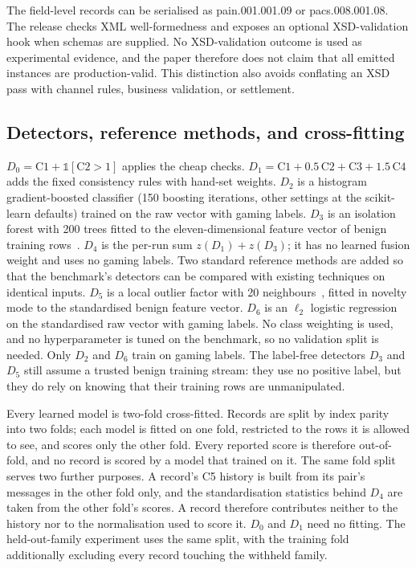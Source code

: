 \documentclass[conference]{IEEEtran}
\begin{document}
The field-level records can be serialised as pain.001.001.09 or
pacs.008.001.08. The release checks XML well-formedness and exposes an optional
XSD-validation hook when schemas are supplied. No XSD-validation outcome is
used as experimental evidence, and the paper therefore does not claim that all
emitted instances are production-valid. This distinction also avoids
conflating an XSD pass with channel rules, business validation, or settlement.

\subsection{Detectors, reference methods, and cross-fitting}
$D_0=\mathrm{C1}+\mathbb{1}[\mathrm{C2}>1]$ applies the cheap checks.
$D_1=\mathrm{C1}+0.5\,\mathrm{C2}+\mathrm{C3}+1.5\,\mathrm{C4}$ adds the
fixed consistency rules with hand-set weights. $D_2$ is a histogram
gradient-boosted classifier (150 boosting iterations, other settings at the
scikit-learn defaults) trained on the raw vector with gaming labels. $D_3$ is
an isolation forest with 200 trees fitted to the eleven-dimensional feature
vector of benign training rows~\cite{liu2008}. $D_4$ is the per-run sum
$z(D_1)+z(D_3)$; it has no learned fusion weight and uses no gaming labels.
Two standard reference methods are added so that the benchmark's detectors
can be compared with existing techniques on identical inputs. $D_5$ is a
local outlier factor with 20 neighbours~\cite{breunig2000}, fitted in novelty
mode to the standardised benign feature vector. $D_6$ is an $\ell_2$
logistic regression on the standardised raw vector with gaming labels. No
class weighting is used, and no hyperparameter is tuned on the benchmark, so
no validation split is needed. Only $D_2$ and $D_6$ train on gaming labels.
The label-free detectors $D_3$ and $D_5$ still assume a trusted benign
training stream: they use no positive label, but they do rely on knowing that
their training rows are unmanipulated.

Every learned model is two-fold cross-fitted. Records are split by index
parity into two folds; each model is fitted on one fold, restricted to the
rows it is allowed to see, and scores only the other fold. Every reported
score is therefore out-of-fold, and no record is scored by a model that
trained on it. The same fold split serves two further purposes. A record's C5 history is
built from its pair's messages in the other fold only, and the
standardisation statistics behind $D_4$ are taken from the other fold's
scores. A record therefore contributes neither to the history nor to the
normalisation used to score it. $D_0$ and $D_1$ need no fitting. The held-out-family
experiment uses the same split, with the training fold additionally excluding
every record touching the withheld family.
\end{document}
